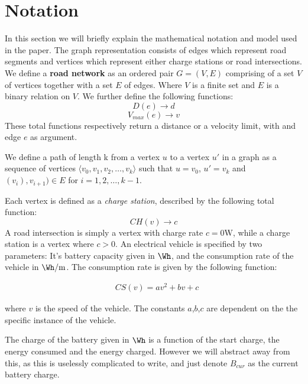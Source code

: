 \section{Notation}
In this section we will briefly explain the mathematical notation and model used in the paper. The graph representation consists of edges which represent road segments and vertices which represent either charge stations or road intersections. We define a \textbf{road network} as an ordered pair \(G=(V,E)\) comprising of a set $V$ of vertices together with a set $E$ of edges. Where $V$ is a finite set and $E$ is a binary relation on $V$. We further define the following functions:
\[ D(e)\rightarrow d \] 
\[ V_{max}(e)\rightarrow v \] 
These total functions respectively return a distance or a velocity limit, with and edge $e$ as argument.

We define a path of length k from a vertex $u$ to a vertex $u'$ in a graph as a sequence of vertices $\langle v_0,v_1,v_2,\dots,v_k \rangle$ such that $u=v_0$, $u'=v_k$ and $(v_{i}),v_{i+1})\in E$ for $i=1,2,\dots ,k-1$.

Each vertex is defined as a \textit{charge station}, described by the following total function:
\[CH(v)\rightarrow c\]
A road intersection is simply a vertex with charge rate $c = 0\si{\W}$, while a charge station is a vertex where $c > 0$. An electrical vehicle is specified by two parameters: It's battery capacity given in $\si{\Wh}$, and the consumption rate of the vehicle in $\si{\Wh\per\metre}$. The consumption rate is given by the following function:

\begin{equation}
\begin{aligned}
 & CS(v)=av^2+bv+c
\end{aligned}
\end{equation}\label{eq:chargingFunc}


where $v$ is the speed of the vehicle. The constants $a$,$b$,$c$ are dependent on the the specific instance of the vehicle.

The charge of the battery given in $\si{\Wh}$ is a function of the start charge, the energy consumed and the energy charged. However we will abstract away from this, as this is uselessly complicated to write, and just denote $B_{cur}$ as the current battery charge.

